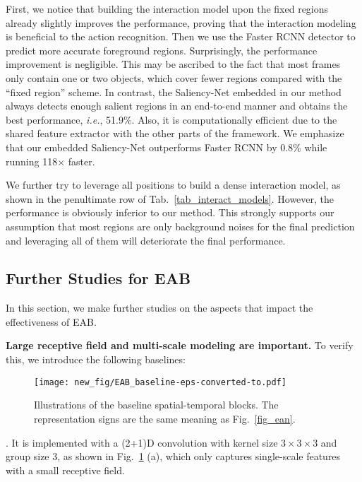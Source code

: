  First, we notice that building the interaction model upon the fixed regions already slightly improves the performance, proving that the interaction modeling is beneficial to the action recognition. Then we use the Faster RCNN detector to predict more accurate foreground regions. Surprisingly, the performance improvement is negligible. This may be ascribed to the fact that most frames only contain one or two objects, which cover fewer regions compared with the ``fixed region'' scheme. In contrast, the Saliency-Net embedded in our method always detects enough salient regions in an end-to-end manner and obtains the best performance, \textit{i.e.}, 51.9\%. Also, it is computationally efficient due to the shared feature extractor with the other parts of the framework. We emphasize that our embedded Saliency-Net outperforms Faster RCNN by 0.8\% while running 118$\times$ faster.
 
 We further try to leverage all positions to build a dense interaction model, as shown in the penultimate row of Tab.~\ref{tab_interact_models}. However, the performance is obviously inferior to our method. This strongly supports our assumption that most regions are only background noises for the final prediction and leveraging all of them will deteriorate the final performance.
 




\subsection{Further Studies for EAB}\label{sec_eab}
In this section, we make further studies on the aspects that impact the effectiveness of EAB.

\textbf{Large receptive field and multi-scale modeling are important.}
To verify this, we introduce the following baselines: 

\begin{figure}[!htb]
	\centering
	\begin{minipage}[b]{0.9\linewidth}
		\centering
		\centerline{\texttt{[image: new\_fig/EAB\_baseline-eps-converted-to.pdf]}}
	\end{minipage}
	\caption {Illustrations of the baseline spatial-temporal blocks.
		The representation signs are the same meaning as Fig.~\ref{fig_ean}.
	}
\spacebelowtab
	\label{fig_base_arch}
\end{figure}



	.
	It is implemented with a (2+1)D convolution with kernel size $3\times3\times3$ and group size 3, as shown in Fig.~\ref{fig_base_arch} (a), which only captures single-scale features with a small receptive field.
	
